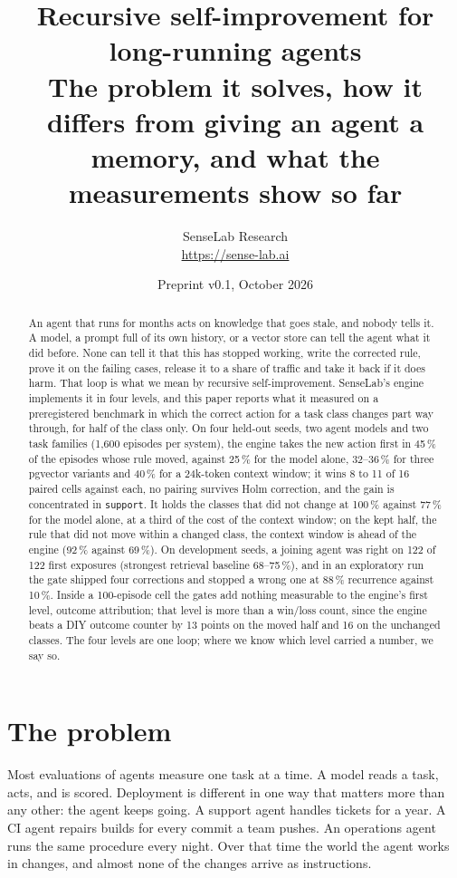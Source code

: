 \documentclass[11pt]{article}
\title{\vspace{-2.2em}\bfseries Recursive self-improvement for long-running agents\\[0.3em]
\large The problem it solves, how it differs from giving an agent a memory, and what the measurements show so far}
\author{SenseLab Research\\[0.3em]\normalsize\url{https://sense-lab.ai}}
\date{Preprint v0.1, October 2026}
\newcommand{\code}[1]{\texttt{#1}}
\begin{document}
\sloppy
\maketitle

\begin{abstract}
\noindent
An agent that runs for months acts on knowledge that goes stale, and nobody tells it. A model,
a prompt full of its own history, or a vector store can tell the agent what it did before. None
can tell it that this has stopped working, write the corrected rule, prove it on the failing
cases, release it to a share of traffic and take it back if it does harm. That loop is what we
mean by recursive self-improvement. SenseLab's engine implements it in four levels, and this
paper reports what it measured on a preregistered benchmark in which the correct action for a
task class changes part way through, for half of the class only. On four held-out seeds, two
agent models and two task families (1,600 episodes per system), the engine takes the new
action first in 45\,\% of the episodes whose rule moved, against 25\,\% for the model alone,
32--36\,\% for three pgvector variants and 40\,\% for a 24k-token context window; it wins 8 to
11 of 16 paired cells against each, no pairing survives Holm correction, and the gain is
concentrated in \code{support}. It holds the classes that did not change at 100\,\% against
77\,\% for the model alone, at a third of the cost of the context window; on the kept half,
the rule that did not move within a changed class, the context window is ahead of the engine
(92\,\% against 69\,\%). On development seeds, a joining agent was right on 122
of 122 first exposures (strongest retrieval baseline 68--75\,\%), and in an exploratory run the
gate shipped four corrections and stopped a wrong one at 88\,\% recurrence against 10\,\%.
Inside a 100-episode cell the gates add nothing measurable to the engine's first level, outcome
attribution; that level is more than a win/loss count, since the engine beats a DIY outcome
counter by 13 points on the moved half and 16 on the unchanged classes. The four levels are one
loop; where we know which level carried a number, we say so.
\end{abstract}

\section{The problem}
\label{sec:problem}

Most evaluations of agents measure one task at a time. A model reads a task, acts, and is
scored. Deployment is different in one way that matters more than any other: the agent keeps
going. A support agent handles tickets for a year. A CI agent repairs builds for every commit a
team pushes. An operations agent runs the same procedure every night. Over that time the world
the agent works in changes, and almost none of the changes arrive as instructions.
\end{document}
